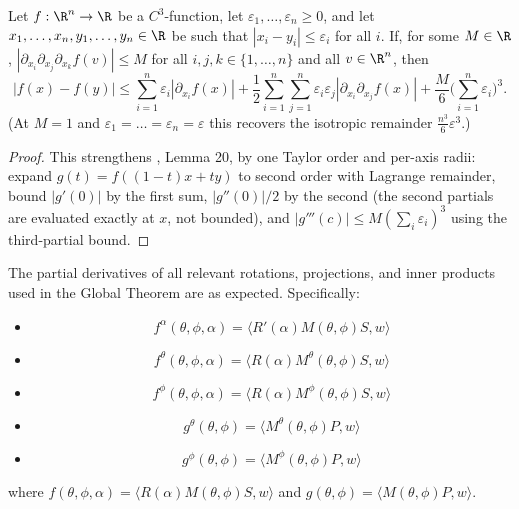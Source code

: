 \begin{lemma} \label{lem:n2}
\leanok
    Let $f:\R^n\to \R$ be a $C^3$-function, let
    $\varepsilon_1,\dots,\varepsilon_n \geq 0$, and let
    $x_1,\dots,x_n,y_1,\dots,y_n \in \R$ be such that
    $|x_i-y_i|\leq \varepsilon_i$ for all $i$.
    If, for some $M \in \R$,
    \(
        \left|\partial_{x_i}\partial_{x_j}\partial_{x_k}f(v)\right| \leq M
    \)
    for all $i,j,k \in \{1,\dots,n\}$ and all $v \in \R^n$, then
    \[
    |f(x)-f(y)|\leq \sum_{i=1}^n \varepsilon_i |\partial_{x_i} f(x)|
      + \frac{1}{2} \sum_{i=1}^n \sum_{j=1}^n \varepsilon_i \varepsilon_j
          |\partial_{x_i}\partial_{x_j} f(x)|
      + \frac{M}{6}\Big(\sum_{i=1}^n \varepsilon_i\Big)^3.
    \]
    (At $M = 1$ and $\varepsilon_1 = \dots = \varepsilon_n = \varepsilon$ this
    recovers the isotropic remainder $\frac{n^3}{6}\varepsilon^3$.)
\end{lemma}

\begin{proof}
\leanok
This strengthens \cite{polyhedron.without.rupert}, Lemma 20, by one Taylor
order and per-axis radii: expand $g(t) = f((1-t)x + ty)$ to second order with
Lagrange remainder, bound $|g'(0)|$ by the first sum, $|g''(0)|/2$ by the
second (the second partials are evaluated exactly at $x$, not bounded), and
$|g'''(c)| \le M (\sum_i \varepsilon_i)^3$ using the third-partial bound.
\end{proof}

\begin{lemma}
\label{lem:rotation_derivatives}
\leanok
{}
The partial derivatives of all relevant rotations, projections, and inner products
used in the Global Theorem are as expected.
Specifically:
\begin{itemize}
\item \[  f^\alpha(\theta,\phi,\alpha) = \langle R'(\alpha) M(\theta, \phi) S, w \rangle \]
\item \[  f^\theta(\theta,\phi,\alpha) = \langle R(\alpha) M^\theta(\theta, \phi) S, w \rangle \]
\item \[  f^\phi(\theta,\phi,\alpha) = \langle R(\alpha) M^\phi(\theta, \phi) S, w \rangle \]
\item \[  g^\theta(\theta,\phi) = \langle  M^\theta(\theta, \phi) P, w \rangle \]
\item \[  g^\phi(\theta,\phi) = \langle  M^\phi(\theta, \phi) P, w \rangle \]
\end{itemize}
where $f(\theta,\phi,\alpha) =  \langle R(\alpha) M(\theta,\phi) S, w\rangle $
and $g(\theta,\phi) =  \langle M(\theta,\phi) P, w\rangle $.
\end{lemma}

